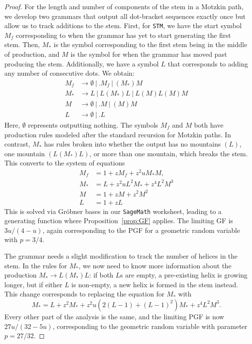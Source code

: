 \documentclass{article}
\newcommand{\STM}{{\tt STM}}
\begin{document}
\begin{proof}
    For the length and number of components of the stem in a Motzkin path, we develop two grammars that output all dot-bracket sequences exactly once but allow us to track additions to the stem.  First, for \STM, we have the start symbol $M_f$ corresponding to when the grammar has yet to start generating the first stem.  Then, $M_*$ is the symbol corresponding to the first stem being in the middle of production, and $M$ is the symbol for when the grammar has moved past producing the stem.  Additionally, we have a symbol $L$ that corresponds to adding any number of consecutive dots.  We obtain:
    \begin{align*}
        M_f &\to \emptyset\ \big|\ .M_f\ \big|\ (M_*)M\\
        M_* &\to L\ \big|\ L(M_*)L\ \big|\ L(M)L(M)M\\
        M &\to \emptyset \ \big|\ .M \ \big|\ (M)M\\
        L &\to \emptyset \ \big|\ .L
    \end{align*}
    Here, $\emptyset$ represents outputting nothing.  The symbols $M_f$ and $M$ both have production rules modeled after the standard recursion for Motzkin paths.  In contrast, $M_*$ has rules broken into whether the output has no mountains $(L)$, one mountain $(L(M_*)L)$, or more than one mountain, which breaks the stem.  This converts to the system of equations
    \begin{align*}
        M_f &= 1 + zM_f + z^2uM_*M,\\
        M_* &= L + z^2uL^2M_* + z^4L^2M^3\\
        M&=1 + zM + z^2M^2\\
        L &= 1+zL
    \end{align*}
    This is solved via Gr\"{o}bner bases in our {\tt SageMath} worksheet, leading to a generating function where Proposition~\ref{prop:GF} applies.  The limiting GF is $3u/(4-u)$, again corresponding to the PGF for a geometric random variable with $p = 3/4$.

    The grammar needs a slight modification to track the number of helices in the stem.  In the rules for $M_*$, we now need to know more information about the production $M_* \to L(M_*)L$: if both $L$s are empty, a pre-existing helix is growing longer, but if either $L$ is non-empty, a new helix is formed in the stem instead.  This change corresponds to replacing the equation for $M_*$ with
    \[
    M_* = L + z^2M_* + z^2u(2(L-1) + (L-1)^2)M_* + z^4L^2M^3.
    \]
    Every other part of the analysis is the same, and the limiting PGF is now $27u/(32 - 5u)$, corresponding to the geometric random variable with parameter $p = 27/32$.
\end{proof}
\end{document}

